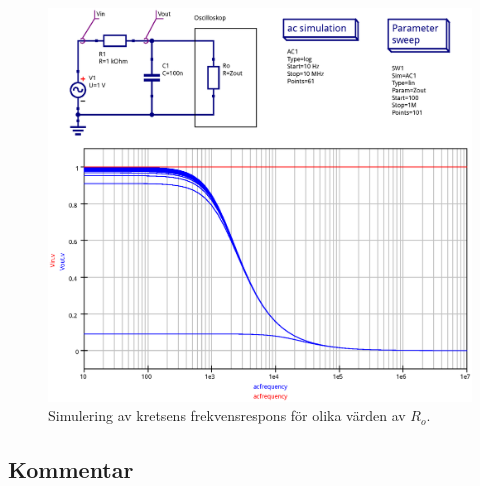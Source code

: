 \begin{figure}[ht]\label{fig:Zout-step}
  \centering
  \includegraphics[width=\linewidth]{sim/ee466_lab-4_prj/uppgift-3_Zout_step}
  \caption[] {Simulering av kretsens frekvensrespons för olika värden av $R_o$.}
\end{figure}

\subsection{Kommentar}\label{}


